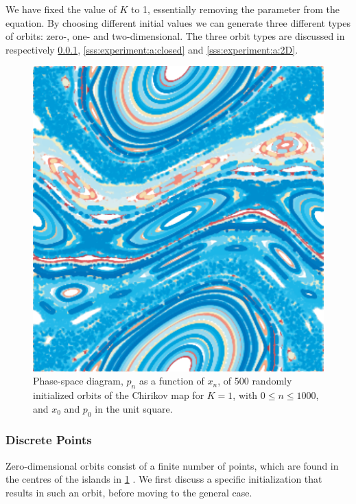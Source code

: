 We have fixed the value of $K$ to 1, essentially removing the parameter from the equation. By choosing different initial values we can generate three different types of orbits: zero-, one- and two-dimensional. The three orbit types are discussed in respectively \cref{sss:experiment:a:discrete}, \ref{sss:experiment:a:closed} and \ref{sss:experiment:a:2D}.

 	\begin{figure}
		\centering
		\includegraphics[width=0.9\columnwidth, height=0.2\textheight, keepaspectratio=true]{./img/assignment_a_pretty_low_res.pdf}
		\caption{Phase-space diagram, $p_n$ as a function of $x_n$, of 500 randomly initialized orbits of the Chirikov map for $K = 1$, with $0 \leq n \leq 1000$, and $x_0$ and $p_0$ in the unit square.}
		\label{fig:a:pretty}
	\end{figure}

\subsubsection{Discrete Points}
\label{sss:experiment:a:discrete}
Zero-dimensional orbits consist of a finite number of points, which are found in the centres of the islands in \cref{fig:a:pretty} \cite{kenzel1997physics}. We first discuss a specific initialization that results in such an orbit, before moving to the general case.\\

